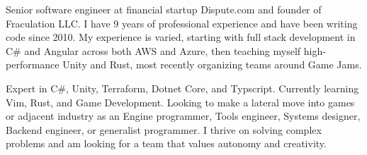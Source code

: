 

\begin{cvparagraph}

Senior software engineer at financial startup Dispute.com and founder of Fraculation LLC.\@
I have 9 years of professional experience and have been writing code since 2010. My experience is varied, starting with 
full stack development in C\# and Angular across both AWS and Azure, then teaching myself high-performance Unity and Rust,
most recently organizing teams around Game Jams.

Expert in C\#, Unity, Terraform, Dotnet Core, and Typscript. Currently learning Vim, Rust, and Game Development. 
Looking to make a lateral move into games or adjacent industry as an Engine programmer, 
Tools engineer,  Systems designer, Backend engineer, or generalist programmer.
I thrive on solving complex problems and am looking for a team that values autonomy and creativity.

\end{cvparagraph}
